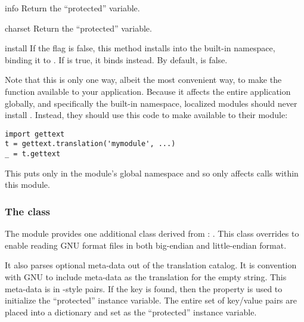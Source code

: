 \begin{methoddesc}[NullTranslations]{info}{}
Return the ``protected''  variable.
\end{methoddesc}

\begin{methoddesc}[NullTranslations]{charset}{}
Return the ``protected''  variable.
\end{methoddesc}

\begin{methoddesc}[NullTranslations]{install}{}
If the  flag is false, this method installs
 into the built-in namespace, binding it to
\samp{_}.  If  is true, it binds 
instead.  By default,  is false.

Note that this is only one way, albeit the most convenient way, to
make the \function{_} function available to your application.  Because it
affects the entire application globally, and specifically the built-in
namespace, localized modules should never install \function{_}.
Instead, they should use this code to make \function{_} available to
their module:

\begin{verbatim}
import gettext
t = gettext.translation('mymodule', ...)
_ = t.gettext
\end{verbatim}

This puts \function{_} only in the module's global namespace and so
only affects calls within this module.
\end{methoddesc}

\subsubsection{The  class}

The  module provides one additional class derived from
: .  This class
overrides  to enable reading GNU 
format  files in both big-endian and little-endian format.

It also parses optional meta-data out of the translation catalog.  It
is convention with GNU  to include meta-data as the
translation for the empty string.  This meta-data is in -style
 pairs.  If the key  is found,
then the  property is used to initialize the
``protected''  instance variable.  The entire set of
key/value pairs are placed into a dictionary and set as the
``protected''  instance variable.

